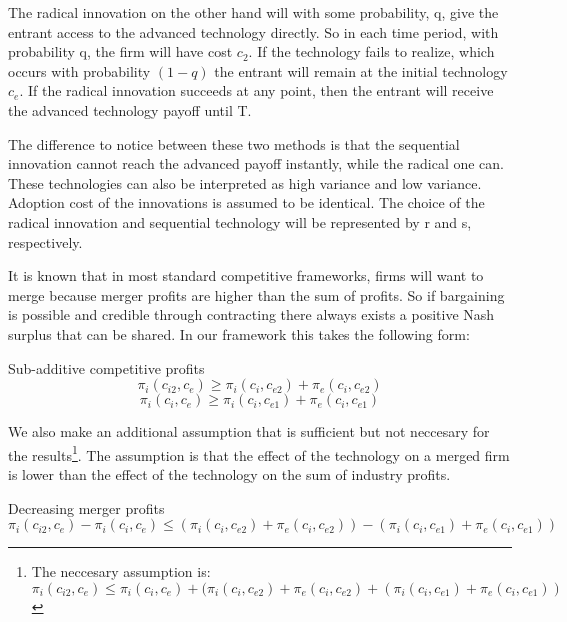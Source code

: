
The radical innovation on the other hand will with some probability, q, give the entrant access to the advanced technology directly. So in each time period, with probability q, the firm will have cost $c_2$. If the technology fails to realize, which occurs with probability $(1-q)$ the entrant will remain at the initial technology $c_e$. If the radical innovation succeeds at any point, then the entrant will receive the advanced technology payoff until T. 


The difference to notice between these two methods is that the sequential innovation cannot reach the advanced payoff instantly, while the radical one can. These technologies can also be interpreted as high variance and low variance. Adoption cost of the innovations is assumed to be identical. The choice of the radical innovation and sequential technology will be represented by r and s, respectively.  


It is known that in most standard competitive frameworks, firms will want to merge because merger profits are higher than the sum of profits. So if bargaining is possible and credible through contracting there always exists a positive Nash surplus that can be shared. In our framework this takes the following form: 

\begin{assumption}{Sub-additive competitive profits}\label{as1}
\begin{equation*}
\pi_{i}(c_{i2},c_{e}) \geq  \pi_{i}(c_{i},c_{e2}) + \pi_{e}(c_{i},c_{e2})
\end{equation*}
\begin{equation*}
\pi_{i}(c_{i},c_{e}) \geq  \pi_{i}(c_{i},c_{e1}) + \pi_{e}(c_{i},c_{e1})
\end{equation*}
\end{assumption}

We also make an additional assumption that is sufficient but not neccesary for the results\footnote{The neccesary assumption is: $\pi_{i}(c_{i2},c_{e}) \leq \pi_{i}(c_{i},c_{e})+(\pi_{i}(c_{i},c_{e2}) + \pi_{e}(c_{i},c_{e2})+(\pi_{i}(c_{i},c_{e1}) + \pi_{e}(c_{i},c_{e1}))$}. The assumption is that the effect of the technology on a merged firm is lower than the effect of the technology on the sum of industry profits. 

\begin{assumption}{Decreasing merger profits}\label{as2}
\begin{equation*}
\pi_{i}(c_{i2},c_{e}) -\pi_{i}(c_{i},c_{e}) \leq (\pi_{i}(c_{i},c_{e2}) + \pi_{e}(c_{i},c_{e2}))-(\pi_{i}(c_{i},c_{e1}) + \pi_{e}(c_{i},c_{e1}))
\end{equation*}
\end{assumption} 

